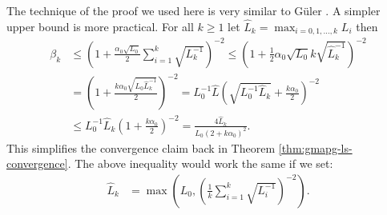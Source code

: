 \documentclass[12pt]{report}
\begin{document}
        \begin{remark}
            The technique of the proof we used here is very similar to Güler \cite[Lemma 2.2]{guler_new_1992}.
            A simpler upper bound is more practical. 
            For all $k \ge 1$ let $\widehat L_k = \max_{i = 0, 1, \ldots, k} L_i$ then 
            \begin{align*}
                \beta_k 
                &\le \left(
                    1 + 
                    \frac{\alpha_0 \sqrt{L_0}}{2}\sum_{i = 1}^{k}\sqrt{L^{-1}_k}
                \right)^{-2}
                \le \left(
                    1 + \frac{1}{2}\alpha_0 \sqrt{L_0}k\sqrt{\widehat L^{-1}_k}
                \right)^{-2}
                \\
                &= \left(
                    1 + \frac{k\alpha_0\sqrt{L_0 \widehat L^{-1}_k}}{2}
                \right)^{-2} = L^{-1}_0\widehat L\left(
                    \sqrt{L_0^{-1}\widehat L_k} + \frac{k\alpha_0}{2}
                \right)^{-2}
                \\
                &\le 
                L^{-1}_0\widehat L_k\left(
                    1 + \frac{k\alpha_0}{2}
                \right)^{-2} 
                = \frac{4\widehat L_k}{L_0(2 + k \alpha_0)^2}. 
            \end{align*}
            This simplifies the convergence claim back in Theorem \ref{thm:gmapg-ls-convergence}. 
            The above inequality would work the same if we set: 
            \begin{align*}
                \widehat L_k &= \max\left(
                    L_0, \left(
                        \frac{1}{k} \sum_{i = 1}^{k} \sqrt{L_i^{-1}}
                    \right)^{-2}
                \right). 
            \end{align*}
        \end{remark}
\end{document}

